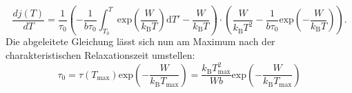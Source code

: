\begin{equation}
    \frac{dj(T)}{dT} = \frac{1}{\tau_0} \left( - \frac{1}{b\tau_0}
    \int_{T_0}^T \text{exp}\left(\frac{W}{k_\text{B}T}\right)\text{d}T' - 
    \frac{W}{k_\text{B}T}\right) \cdot \left( \frac{W}{k_\text{B}T^2} - 
    \frac{1}{b\tau_0} 
    \text{exp}\left(-\frac{W}{k_\text{B}T}\right)\right).
\end{equation}
Die abgeleitete Gleichung lässt sich nun am Maximum nach der charakteristischen Relaxationszeit umstellen:
\begin{equation}
    \tau_0 = \tau(T_\text{max})\text{exp}\left(- \frac{W}{k_\text{B}T_\text{max}}\right) = \frac{k_\text{B}T^2_\text{max}}{Wb}\text{exp}\left(-\frac{W}{k_\text{B}T_\text{max}}\right)
    \label{eqn:taumaxsource}
\end{equation}
